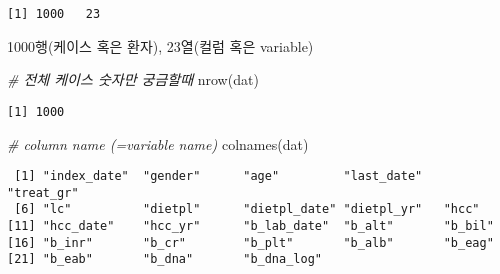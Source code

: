 \documentclass[
]{article}
\newenvironment{Shaded}{\begin{snugshade}}{\end{snugshade}}
\newcommand{\CommentTok}[1]{\textcolor[rgb]{0.56,0.35,0.01}{\textit{#1}}}
\newcommand{\FunctionTok}[1]{\textcolor[rgb]{0.00,0.00,0.00}{#1}}
\newcommand{\NormalTok}[1]{#1}
\begin{document}
\begin{verbatim}
[1] 1000   23
\end{verbatim}

1000행(케이스 혹은 환자), 23열(컬럼 혹은 variable)

\begin{Shaded}
\begin{Highlighting}[]
\CommentTok{\# 전체 케이스 숫자만 궁금할때}
\FunctionTok{nrow}\NormalTok{(dat)}
\end{Highlighting}
\end{Shaded}

\begin{verbatim}
[1] 1000
\end{verbatim}

\begin{Shaded}
\begin{Highlighting}[]
\CommentTok{\# column name (=variable name)}
\FunctionTok{colnames}\NormalTok{(dat)}
\end{Highlighting}
\end{Shaded}

\begin{verbatim}
 [1] "index_date"  "gender"      "age"         "last_date"   "treat_gr"   
 [6] "lc"          "dietpl"      "dietpl_date" "dietpl_yr"   "hcc"        
[11] "hcc_date"    "hcc_yr"      "b_lab_date"  "b_alt"       "b_bil"      
[16] "b_inr"       "b_cr"        "b_plt"       "b_alb"       "b_eag"      
[21] "b_eab"       "b_dna"       "b_dna_log"  
\end{verbatim}
\end{document}
